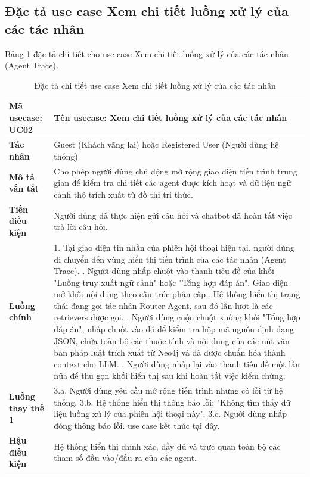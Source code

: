 \documentclass[../DoAn.tex]{subfiles}
\begin{document}
\subsection{Đặc tả use case Xem chi tiết luồng xử lý của các tác nhân}
Bảng \ref{table:uc_specs_trace} đặc tả chi tiết cho use case Xem chi tiết luồng xử lý của các tác nhân (Agent Trace).
\begin{table}[H]
\centering
\begin{tabular}{|p{3.5cm}|p{11.5cm}|}
\hline
\textbf{Mã usecase:} UC02 & \textbf{Tên usecase:} Xem chi tiết luồng xử lý của các tác nhân \\ \hline
\textbf{Tác nhân} & Guest (Khách vãng lai) hoặc Registered User (Người dùng hệ thống) \\ \hline
\textbf{Mô tả vắn tắt} & Cho phép người dùng chủ động mở rộng giao diện tiến trình trung gian để kiểm tra chi tiết các agent được kích hoạt và dữ liệu ngữ cảnh thô trích xuất từ đồ thị tri thức. \\ \hline
\textbf{Tiền điều kiện} & Người dùng đã thực hiện gửi câu hỏi và chatbot đã hoàn tất việc trả lời câu hỏi. \\ \hline
\textbf{Luồng chính} &
1. Tại giao diện tin nhắn của phiên hội thoại hiện tại, người dùng di chuyển đến vùng hiển thị tiến trình của các tác nhân (Agent Trace). \newline
2. Người dùng nhấp chuột vào thanh tiêu đề của khối "Luồng truy xuất ngữ cảnh" hoặc "Tổng hợp đáp án". Giao diện mở khối nội dung theo cấu trúc phân cấp.\newline
3. Hệ thống hiển thị trạng thái đang gọi tác nhân Router Agent, sau đó lần lượt là các retrievers được gọi. \newline
4. Người dùng cuộn chuột xuống khối "Tổng hợp đáp án", nhấp chuột vào đó để kiểm tra hộp mã nguồn định dạng JSON, chứa toàn bộ các thuộc tính và nội dung của các nút văn bản pháp luật trích xuất từ Neo4j và đã được chuẩn hóa thành context cho LLM. \newline
5. Người dùng nhấp lại vào thanh tiêu đề một lần nữa để thu gọn khối hiển thị sau khi hoàn tất việc kiểm chứng. \\ \hline
\textbf{Luồng thay thế 1} &
3.a. Người dùng yêu cầu mở rộng tiến trình nhưng có lỗi từ hệ thống. \newline
3.b. Hệ thống hiển thị thông báo lỗi: "Không tìm thấy dữ liệu luồng xử lý của phiên hội thoại này". \newline
3.c. Người dùng nhấp đóng thông báo lỗi. use case kết thúc tại đây. \\ \hline
\textbf{Hậu điều kiện} & Hệ thống hiển thị chính xác, đầy đủ và trực quan toàn bộ các tham số đầu vào/đầu ra của các agent.  \\ \hline
\end{tabular}
\caption{Đặc tả chi tiết use case Xem chi tiết luồng xử lý của các tác nhân}
\label{table:uc_specs_trace}
\end{table}
\end{document}
